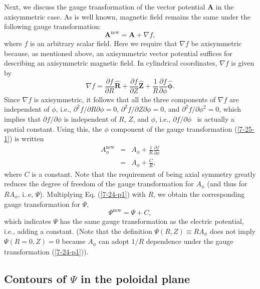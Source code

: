 \documentclass{llncs}
\newcommand{\tmmathbf}[1]{\ensuremath{\boldsymbol{#1}}}
\newcommand{\tmop}[1]{\ensuremath{\operatorname{#1}}}
\begin{document}
Next, we discuss the gauge transformation of the vector potential $\mathbf{A}$
in the axisymmetric case. As is well known, magnetic field remains the same
under the following gauge transformation:
\begin{equation}
  \label{7-25-1} \mathbf{A}^{\tmop{new}} =\mathbf{A}+ \nabla f,
\end{equation}
where $f$ is an arbitrary scalar field. Here we require that $\nabla f$ be
axisymmetric because, as mentioned above, an axisymmetric vector potential
suffices for describing an axisymmetric magnetic field. In cylindrical
coordinates, $\nabla f$ is given by
\begin{equation}
  \nabla f = \frac{\partial f}{\partial R} \hat{\mathbf{R}} + \frac{\partial
  f}{\partial Z} \hat{\mathbf{Z}} + \frac{1}{R}  \frac{\partial f}{\partial
  \phi} \hat{\tmmathbf{\phi}} .
\end{equation}
Since $\nabla f$ is axisymmetric, it follows that all the three components of
$\nabla f$ are independent of $\phi$, i.e., $\partial^2 f / \partial R
\partial \phi = 0$, $\partial^2 f / \partial Z \partial \phi = 0$, and
$\partial^2 f / \partial \phi^2 = 0$, which implies that $\partial f /
\partial \phi$ is independent of $R$, $Z$, and $\phi$, i.e., $\partial f /
\partial \phi$ \ is actually a spatial constant. Using this, the $\phi$
component of the gauge transformation (\ref{7-25-1}) is written
\begin{eqnarray}
  A_{\phi}^{\tmop{new}} & = & A_{\phi} + \frac{1}{R}  \frac{\partial
  f}{\partial \phi} \nonumber\\
  & = & A_{\phi} + \frac{C}{R},  \label{7-24-p1}
\end{eqnarray}
where $C$ is a constant. Note that the requirement of being axial symmetry
greatly reduces the degree of freedom of the gauge transformation for
$A_{\phi}$ (and thus for $R A_{\phi}$, i..e, $\Psi$). Multiplying Eq.
(\ref{7-24-p1}) with $R$, we obtain the corresponding gauge transformation for
$\Psi$,
\begin{equation}
  \label{7-24-p3} \Psi^{\tmop{new}} = \Psi + C,
\end{equation}
which indicates $\Psi$ has the same gauge transformation as the electric
potential, i.e., adding a constant. (Note that the definition $\Psi (R, Z)
\equiv R A_{\phi}$ does not imply $\Psi (R = 0, Z) = 0$ because $A_{\phi}$ can
adopt $1 / R$ dependence under the gauge transformation (\ref{7-24-p1})).

\subsection{Contours of $\Psi$ in the poloidal plane}\label{20-5-8-p1}
\end{document}
